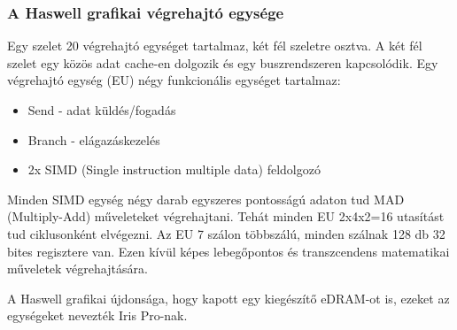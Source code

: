 \subsubsection{A Haswell grafikai végrehajtó egysége}
Egy szelet 20 végrehajtó egységet tartalmaz, két fél szeletre osztva.
A két fél szelet egy közös adat cache-en dolgozik és egy buszrendszeren kapcsolódik.
Egy végrehajtó egység (EU) négy funkcionális egységet tartalmaz:
\begin{itemize}
    \item Send - adat küldés/fogadás
    \item Branch - elágazáskezelés
    \item 2x SIMD (Single instruction multiple data) feldolgozó
\end{itemize}
Minden SIMD egység négy darab egyszeres pontosságú adaton tud MAD (Multiply-Add) műveleteket végrehajtani.
Tehát minden EU 2x4x2=16 utasítást tud ciklusonként elvégezni.
Az EU 7 szálon többszálú, minden szálnak 128 db 32 bites regisztere van.
Ezen kívül képes lebegőpontos és transzcendens matematikai műveletek végrehajtására.

A Haswell grafikai újdonsága, hogy kapott egy kiegészítő eDRAM-ot is, ezeket az egységeket nevezték Iris Pro-nak.

